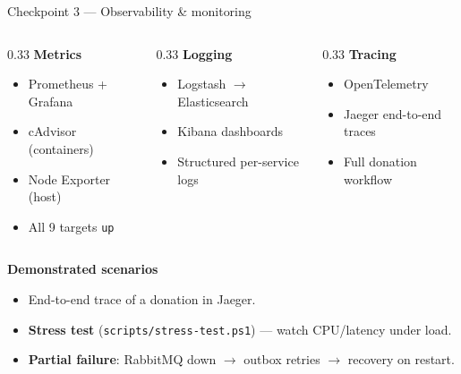 \documentclass[aspectratio=169]{beamer}
\begin{document}
\begin{frame}{Checkpoint 3 --- Observability \& monitoring}
  \begin{columns}[T]
    \begin{column}{0.33\textwidth}
      \textbf{Metrics}
      \begin{itemize}\scriptsize
        \item Prometheus + Grafana
        \item cAdvisor (containers)
        \item Node Exporter (host)
        \item All 9 targets \texttt{up}
      \end{itemize}
    \end{column}
    \begin{column}{0.33\textwidth}
      \textbf{Logging}
      \begin{itemize}\scriptsize
        \item Logstash $\rightarrow$ Elasticsearch
        \item Kibana dashboards
        \item Structured per-service logs
      \end{itemize}
    \end{column}
    \begin{column}{0.33\textwidth}
      \textbf{Tracing}
      \begin{itemize}\scriptsize
        \item OpenTelemetry
        \item Jaeger end-to-end traces
        \item Full donation workflow
      \end{itemize}
    \end{column}
  \end{columns}
  \vspace{0.4em}
  \textbf{Demonstrated scenarios}
  \begin{itemize}\scriptsize
    \item End-to-end trace of a donation in Jaeger.
    \item \textbf{Stress test} (\texttt{scripts/stress-test.ps1}) --- watch CPU/latency under load.
    \item \textbf{Partial failure}: RabbitMQ down $\rightarrow$ outbox retries $\rightarrow$ recovery on restart.
  \end{itemize}
\end{frame}
\end{document}
